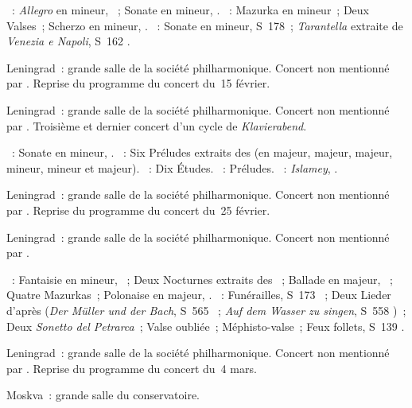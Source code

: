 \begin{description}
 \textsc{\Schumann{}}~: \emph{Allegro} en \kB mineur, ~; Sonate en
 \kF \Sharp mineur, .
 \textsc{\Chopin{}}~: Mazurka en \kB mineur~; Deux Valses~; Scherzo en \kB
 mineur, .
 \textsc{\Liszt{}}~: Sonate en \kB mineur, S~178~; \emph{Tarantella}
 extraite de \emph{Venezia e Napoli}, S~162 .
 \item[\DateWithWeekDay{1945-02-18}]
 Leningrad~: grande salle de la société philharmonique.
 Concert non mentionné par \citet[p.~423]{Scriabine}.
 Reprise du programme du concert du~15 février.
 \item[\DateWithWeekDay{1945-02-25}]
 Leningrad~: grande salle de la société philharmonique.
 Concert non mentionné par \citet[p.~423]{Scriabine}.
 Troisième et dernier concert d'un cycle de
 \foreignlanguage{german}{\emph{Klavierabend}}.

 \textsc{\Glazounov{}}~: Sonate  en \kB \Flat mineur, .
 \textsc{\Rachmaninov{}}~: Six Préludes extraits des  (en \kE
 \Flat majeur, \kC majeur, \kF majeur, \kA mineur, \kG \Sharp mineur et \kB
 \Flat majeur).
 \textsc{\Scriabine{}}~: Dix Études.
 \textsc{\Chostakovitch{}}~: Préludes.
 \textsc{\Balakirev{}}~: \emph{Islamey}, .
 \item[\DateWithWeekDay{1945-02-27}]
 Leningrad~: grande salle de la société philharmonique.
 Concert non mentionné par \citet[p.~423]{Scriabine}.
 Reprise du programme du concert du~25 février.
 \item[\DateWithWeekDay{1945-03-04}]
 Leningrad~: grande salle de la société philharmonique.
 Concert non mentionné par \citet[p.~423]{Scriabine}.

 \textsc{\Chopin{}}~: Fantaisie en \kF mineur, ~; Deux Nocturnes
 extraits des ~; Ballade  en \kA \Flat majeur,
 ~; Quatre Mazurkas~; Polonaise en \kA \Flat majeur, .
 \textsc{\Liszt{}}~: Funérailles, S~173 ~; Deux Lieder d'après
 \Schubert{} (\emph{Der Müller und der Bach}, S~565 ~; \emph{Auf
 dem Wasser zu singen}, S~558 )~; Deux \emph{Sonetto del
 Petrarca}~; Valse oubliée~; Méphisto-valse~; Feux follets, S~139
 .
 \item[\DateWithWeekDay{1945-03-09}]
 Leningrad~: grande salle de la société philharmonique.
 Concert non mentionné par \citet[p.~423]{Scriabine}.
 Reprise du programme du concert du~4 mars.
 \item[\DateWithWeekDay{1945-03-23}]
 Moskva~: grande salle du conservatoire.


\end{description}
